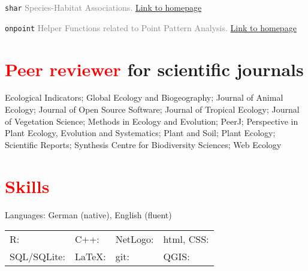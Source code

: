 \documentclass[hidelinks]{report}
\begin{document}
\texttt{shar} \textcolor{grey}{Species-Habitat Associations.}
\hfill
\textcolor{blue}{\href{https://r-sptialecology.github.io/shar/}{Link to homepage}}

\texttt{onpoint} \textcolor{grey}{Helper Functions related to Point Pattern Analysis.}
\hfill
\textcolor{blue}{\href{https://r-spatialecology.github.io/onpoint/}{Link to homepage}}



\section*{\textcolor{red}{Peer reviewer} for scientific journals \sout{\hfill}}

Ecological Indicators;
Global Ecology and Biogeography;
Journal of Animal Ecology;
Journal of Open Source Software;
Journal of Tropical Ecology;
Journal of Vegetation Science;
Methods in Ecology and Evolution;
PeerJ;
Perspective in Plant Ecology, Evolution and Systematics;
Plant and Soil;
Plant Ecology;
Scientific Reports;
Synthesis Centre for Biodiversity Sciences;
Web Ecology

\newpage


\section*{\textcolor{red}{Skills} \sout{\hfill}}

Languages: German (native), English (fluent)

\begin{center}
	\begin{tabular}{l l l l}
		
		R: \textcolor{blue}{\faCircle \faCircle \faCircle \faCircle \faCircle} & 
		C++: \textcolor{blue}{\faCircle \faCircle \faCircle \faCircleO \faCircleO} & 
		NetLogo: \textcolor{blue}{\faCircle \faCircle \faCircleO \faCircleO \faCircleO} &
		html, CSS: \textcolor{blue}{\faCircle \faCircleO \faCircleO \faCircleO \faCircleO} \\
	
		SQL/SQLite: \textcolor{blue}{\faCircle \faCircleO \faCircleO \faCircleO \faCircleO} &
		LaTeX: \textcolor{blue}{\faCircle \faCircle \faCircle \faCircleO \faCircleO} &
		git: \textcolor{blue}{\faCircle \faCircle \faCircle \faCircleO \faCircleO} &
		QGIS: \textcolor{blue}{\faCircle \faCircle \faCircleO \faCircleO \faCircleO} \\

	\end{tabular}
\end{center}
\end{document}
